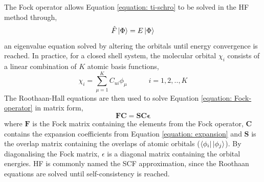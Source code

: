 The Fock operator allows Equation \ref{equation: ti-schro} to be solved in the \ac{HF} method through,
\begin{equation}\label{equation: Fock-operator}
    \hat{F}\ket{\Phi}=E\ket{\Phi}
\end{equation}
an eigenvalue equation solved by altering the orbitals until energy convergence is reached. In practice, for a closed shell system, the molecular orbital $\chi_{i}$ consists of a linear combination of $K$ atomic basis functions,
\begin{equation}\label{equation: expansion}
    \chi_{i}=\sum_{\mu=1}^{K}C_{ui}\phi_{\mu}\qquad\quad{}i=1,2,..,K
\end{equation}
The Roothaan-Hall equations are then used to solve Equation \ref{equation: Fock-operator} in matrix form,\cite{Roothaan1951,Hall1951}
\begin{equation}
    \bm{FC}={\bm{SC\epsilon}}
\end{equation}
where $\bm{F}$ is the Fock matrix containing the elements from the Fock operator, $\bm{C}$ contains the expansion coefficients from Equation \ref{equation: expansion} and $\bm{S}$ is the overlap matrix containing the overlaps of atomic orbitals ($\bra{\phi_{i}}\ket{\phi_{j}}$). By diagonalising the Fock matrix, $\epsilon$ is a diagonal matrix containing the orbital energies. \ac{HF} is commonly named the \ac{SCF} approximation, since the Roothaan equations are solved until self-consistency is reached.

